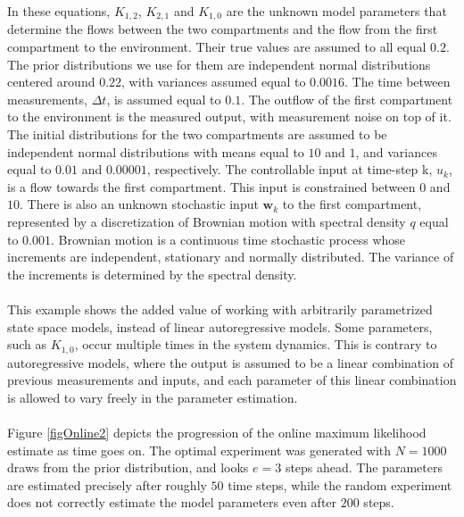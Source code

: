 In these equations, $K_{1,2}$, $K_{2,1}$ and $K_{1,0}$ are the unknown model parameters that determine the flows between the two compartments and the flow from the first compartment to the environment. Their true values are assumed to all equal $0.2$. The prior distributions we use for them are independent normal distributions centered around $0.22$, with variances assumed equal to $0.0016$. The time between measurements, $\Delta t$, is assumed equal to $0.1$. The outflow of the first compartment to the environment is the measured output, with measurement noise on top of it. The initial distributions for the two compartments are assumed to be independent normal distributions with means equal to $10$ and $1$, and variances equal to $0.01$ and $0.00001$, respectively. The controllable input at time-step k, $u_k$, is a flow towards the first compartment. This input is constrained between $0$ and $10$. {\color{red}There is also an unknown stochastic input $\bm w_k$ to the first compartment, represented by a discretization of Brownian motion with spectral density $q$ equal to $0.001$. Brownian motion is a continuous time stochastic process whose increments are independent, stationary and normally distributed. The variance of the increments is determined by the spectral density.}
\\
\\
This example shows the added value of working with arbitrarily parametrized state space models, instead of linear autoregressive models. Some parameters, such as $K_{1,0}$, occur multiple times in the system dynamics. This is contrary to autoregressive models, where the output is assumed to be a linear combination of previous measurements and inputs, and each parameter of this linear combination is allowed to vary freely in the parameter estimation.
\\
\\
Figure \ref{figOnline2} depicts the progression of the online maximum likelihood estimate as time goes on. The optimal experiment was generated with $N=1000$ draws from the prior distribution, and looks $e=3$ steps ahead. The parameters are estimated precisely after roughly $50$ time steps, while the random experiment does not correctly estimate the model parameters even after $200$ steps.
